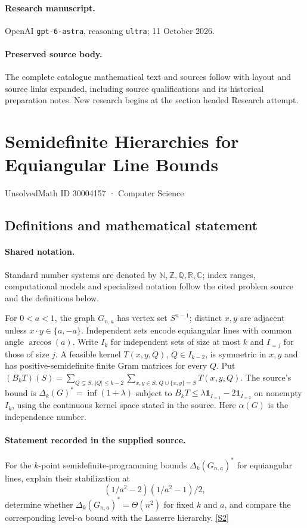 \documentclass[11pt]{article}
\begin{document}
\paragraph{Research manuscript.} OpenAI \texttt{gpt-6-astra}, reasoning \texttt{ultra}; 11 October 2026.
\paragraph{Preserved source body.} The complete catalogue mathematical text and sources follow with layout and source links expanded, including source qualifications and its historical preparation notes. New research begins at the section headed Research attempt.

\section{Semidefinite Hierarchies for Equiangular Line Bounds}\label{30004157}
{\small UnsolvedMath ID 30004157 · Computer Science}
\subsection{Definitions and mathematical statement}

\paragraph{Shared notation.}Standard number systems are denoted by $\mathbb N,\mathbb Z,\mathbb Q,\mathbb R,\mathbb C$; index ranges, computational models and specialized notation follow the cited problem source and the definitions below.


For $0<a<1$, the graph $G_{n,a}$ has vertex set $S^{n-1}$; distinct $x,y$ are adjacent unless $x\cdot y\in\{a,-a\}$. Independent sets encode equiangular lines with common angle $\arccos(a)$. Write $I_k$ for independent sets of size at most $k$ and $I_{=j}$ for those of size $j$. A feasible kernel $T(x,y,Q)$, $Q\in I_{k-2}$, is symmetric in $x,y$ and has positive-semidefinite finite Gram matrices for every $Q$. Put $(B_kT)(S)=\sum_{Q\subseteq S,\,|Q|\leq k-2}\sum_{x,y\in S:\,Q\cup\{x,y\}=S}T(x,y,Q)$. The source's bound is $\Delta_k(G)^*=\inf(1+\lambda)$ subject to $B_kT\leq\lambda\mathbf1_{I_{=1}}-2\mathbf1_{I_{=2}}$ on nonempty $I_k$, using the continuous kernel space stated in the source. Here $\alpha(G)$ is the independence number.
\paragraph{Statement recorded in the supplied source.}
For the $k$-point semidefinite-programming bounds $\Delta_k(G_{n,a})^*$ for equiangular lines, explain their stabilization at $$(1/a^2-2)(1/a^2-1)/2,$$ determine whether $\Delta_k(G_{n,a})^*=\Theta(n^2)$ for fixed $k$ and $a$, and compare the corresponding level-$\alpha$ bound with the Lasserre hierarchy. \href{https://doi.org/10.4171/owr/2019/26}{[S2]}
\end{document}
